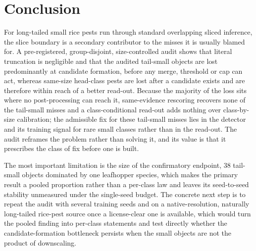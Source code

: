 \section{Conclusion}\label{sec:conclusion}

For long-tailed small rice pests run through standard overlapping sliced inference, the slice boundary is a secondary contributor to the misses it is usually blamed for. A pre-registered, group-disjoint, size-controlled audit shows that literal truncation is negligible and that the audited tail-small objects are lost predominantly at candidate formation, before any merge, threshold or cap can act, whereas same-size head-class pests are lost after a candidate exists and are therefore within reach of a better read-out. Because the majority of the loss sits where no post-processing can reach it, same-evidence rescoring recovers none of the tail-small misses and a class-conditional read-out adds nothing over class-by-size calibration; the admissible fix for these tail-small misses lies in the detector and its training signal for rare small classes rather than in the read-out. The audit reframes the problem rather than solving it, and its value is that it prescribes the class of fix before one is built.

The most important limitation is the size of the confirmatory endpoint, 38 tail-small objects dominated by one leafhopper species, which makes the primary result a pooled proportion rather than a per-class law and leaves its seed-to-seed stability unmeasured under the single-seed budget. The concrete next step is to repeat the audit with several training seeds and on a native-resolution, naturally long-tailed rice-pest source once a license-clear one is available, which would turn the pooled finding into per-class statements and test directly whether the candidate-formation bottleneck persists when the small objects are not the product of downscaling.
